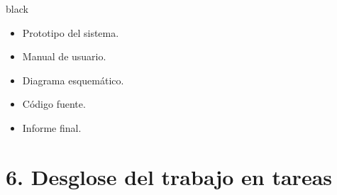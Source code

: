 \documentclass[11pt]{charter}
\begin{document}
\begin{consigna}{black}
\vspace{-35px}
\begin{itemize}
\item Prototipo del sistema.
\item Manual de usuario.
\item Diagrama esquemático.
\item Código fuente.
\item Informe final.

\end{itemize}

\end{consigna}

\section{6. Desglose del trabajo en tareas}
\label{sec:wbs}
\end{document}

